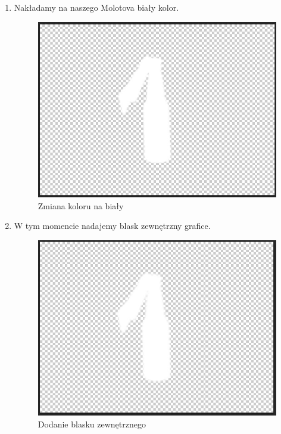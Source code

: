 \begin{enumerate}
  \item Nakładamy na naszego Molotova biały kolor.
\begin{figure}[h]
    \centering
    \includegraphics[scale=0.5]{Images/MolotovPNGWhite.jpg}
    \caption{Zmiana koloru na biały}
    \label{fig:visBuglist}
\end{figure}
\FloatBarrier

  \item W tym momencie nadajemy blask zewnętrzny grafice.
\begin{figure}[h]
    \centering
    \includegraphics[scale=0.5]{Images/MolotovPNGWhiteBlask.jpg}
    \caption{Dodanie blasku zewnętrznego}
    \label{fig:visBuglist}
\end{figure}
\FloatBarrier


\end{enumerate}
